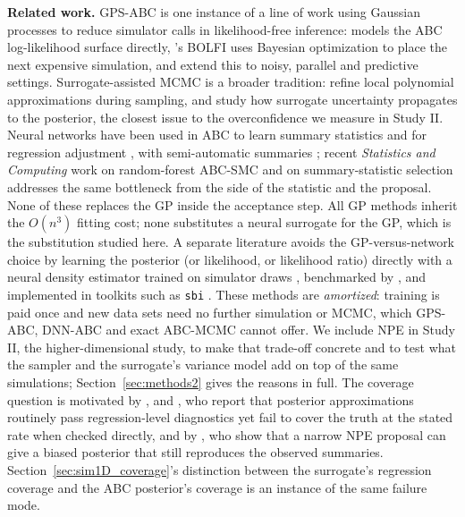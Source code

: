 \documentclass[sn-basic,iicol,pdflatex]{sn-jnl}
\begin{document}
\noindent\textbf{Related work.} GPS-ABC is one instance of a line of work using
Gaussian processes to reduce simulator calls in likelihood-free inference:
\citet{wilkinson2014} models the ABC log-likelihood surface directly,
\citet{gutmann2016}'s BOLFI uses Bayesian optimization to place the next
expensive simulation, and \citet{jarvenpaa2021,jarvenpaa2023} extend this to
noisy, parallel and predictive settings. Surrogate-assisted MCMC is a broader tradition: \citet{conrad2016} refine local polynomial approximations during sampling, and \citet{reiser2025} study how surrogate uncertainty propagates to the posterior, the closest issue to the overconfidence we measure in Study II. Neural networks have been used in ABC to learn summary statistics \citep{jiang2017} and for regression adjustment \citep{blum2010}, with semi-automatic summaries \citep{fearnhead2012}; recent \emph{Statistics and Computing} work on random-forest ABC-SMC \citep{dinh2025} and on summary-statistic selection \citep{hoffmann2026} addresses the same bottleneck from the side of the statistic and the proposal. None of these replaces the GP inside the acceptance step. All GP methods inherit the $O(n^3)$ fitting cost;
none substitutes a neural surrogate for the GP, which is the substitution
studied here. A separate literature avoids the GP-versus-network choice by
learning the posterior (or likelihood, or likelihood ratio) directly with a
neural density estimator trained on simulator draws
\citep{papamakarios2016,papamakarios2019,greenberg2019,cranmer2020,radev2022}, benchmarked by \citet{lueckmann2021}, and implemented in toolkits such
as \texttt{sbi} \citep{tejerocantero2020}. These methods are \emph{amortized}:
training is paid once and new data sets need no further simulation or MCMC,
which GPS-ABC, DNN-ABC and exact ABC-MCMC cannot offer. We include NPE in Study II, the higher-dimensional
study, to make that trade-off concrete and to test what the sampler and the surrogate's variance model add on top of the same
simulations; Section~\ref{sec:methods2} gives the reasons in full. The coverage question is motivated by
\citet{talts2018}, \citet{lemos2023} and \citet{hermans2022}, who report that posterior
approximations routinely pass regression-level diagnostics yet fail to cover the
truth at the stated rate when checked directly, and by \citet{fanwhite2026},
who show that a narrow NPE proposal can give a biased posterior that still
reproduces the observed summaries. Section~\ref{sec:sim1D_coverage}'s distinction
between the surrogate's regression coverage and the ABC posterior's coverage is
an instance of the same failure mode.
\end{document}
